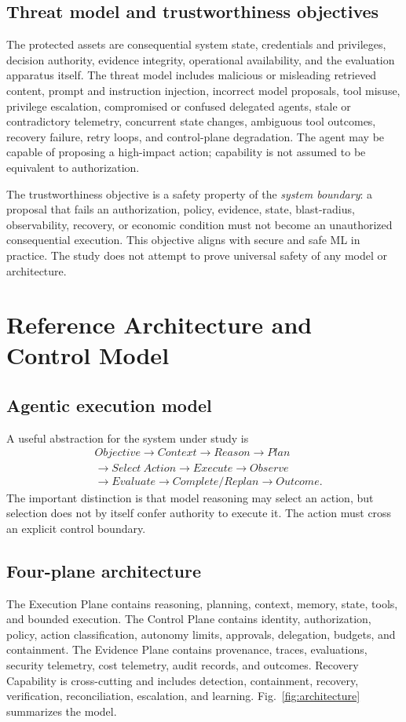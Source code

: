 \documentclass[conference]{IEEEtran}
\begin{document}
\subsection{Threat model and trustworthiness objectives}
The protected assets are consequential system state, credentials and privileges, decision authority, evidence integrity, operational availability, and the evaluation apparatus itself. The threat model includes malicious or misleading retrieved content, prompt and instruction injection, incorrect model proposals, tool misuse, privilege escalation, compromised or confused delegated agents, stale or contradictory telemetry, concurrent state changes, ambiguous tool outcomes, recovery failure, retry loops, and control-plane degradation. The agent may be capable of proposing a high-impact action; capability is not assumed to be equivalent to authorization.

The trustworthiness objective is a safety property of the \emph{system boundary}: a proposal that fails an authorization, policy, evidence, state, blast-radius, observability, recovery, or economic condition must not become an unauthorized consequential execution. This objective aligns with secure and safe ML in practice. The study does not attempt to prove universal safety of any model or architecture.

\section{Reference Architecture and Control Model}
\subsection{Agentic execution model}
A useful abstraction for the system under study is
\begin{equation*}
\begin{aligned}
&Objective \rightarrow Context \rightarrow Reason \rightarrow Plan \\
&\rightarrow Select\ Action \rightarrow Execute \rightarrow Observe \\
&\rightarrow Evaluate \rightarrow Complete/Replan \rightarrow Outcome.
\end{aligned}
\end{equation*}
The important distinction is that model reasoning may select an action, but selection does not by itself confer authority to execute it. The action must cross an explicit control boundary.

\subsection{Four-plane architecture}
The Execution Plane contains reasoning, planning, context, memory, state, tools, and bounded execution. The Control Plane contains identity, authorization, policy, action classification, autonomy limits, approvals, delegation, budgets, and containment. The Evidence Plane contains provenance, traces, evaluations, security telemetry, cost telemetry, audit records, and outcomes. Recovery Capability is cross-cutting and includes detection, containment, recovery, verification, reconciliation, escalation, and learning. Fig.~\ref{fig:architecture} summarizes the model.
\end{document}
